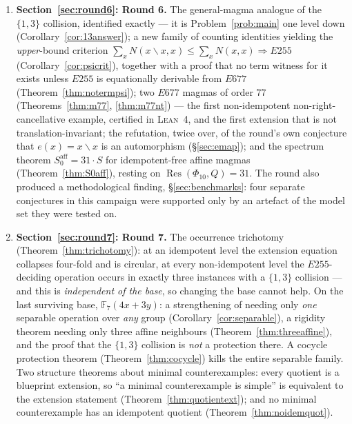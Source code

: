 \documentclass[11pt]{article}
\theoremstyle{plain}
\theoremstyle{definition}
\theoremstyle{remark}
\numberwithin{equation}{section}
\newcommand{\F}{\mathbb{F}}
\begin{document}
\begin{enumerate}
\item \textbf{Section~\ref{sec:round6}: Round 6.} The general-magma analogue of the
$\{1,3\}$ collision, identified exactly --- it is Problem~\ref{prob:main} one level down
(Corollary~\ref{cor:13answer}); a new family of counting identities yielding the
\emph{upper}-bound criterion $\sum_xN(x\backslash x,x)\le\sum_xN(x,x)\Rightarrow E255$
(Corollary~\ref{cor:psicrit}), together with a proof that no term witness for it exists
unless $E255$ is equationally derivable from $E677$ (Theorem~\ref{thm:notermpsi}); two $E677$ magmas of order $77$
(Theorems~\ref{thm:m77}, \ref{thm:m77nt}) --- the first non-idempotent
non-right-cancellative example, certified in \textsc{Lean}~4, and the first extension that
is not translation-invariant; the refutation, twice over, of the round's own conjecture that
$e(x) = x\backslash x$ is an automorphism (\S\ref{sec:emap}); and the spectrum theorem
$S_0^{\mathrm{aff}} = 31\cdot S$ for idempotent-free affine magmas
(Theorem~\ref{thm:S0aff}), resting on $\operatorname{Res}(\Phi_{10},Q) = 31$. The round
also produced a methodological finding, \S\ref{sec:benchmarks}: four separate conjectures
in this campaign were supported only by an artefact of the model set they were tested on.

\item \textbf{Section~\ref{sec:round7}: Round 7.} The occurrence trichotomy
(Theorem~\ref{thm:trichotomy}): at an idempotent level the extension equation collapses
four-fold and is circular, at every non-idempotent level the $E255$-deciding operation occurs
in exactly three instances with a $\{1,3\}$ collision --- and this is \emph{independent of the
base}, so changing the base cannot help. On the last surviving base, $\F_7(4x+3y)$: a
strengthening of \cite[Lemma~13.4]{blueprint} needing only \emph{one} separable operation over
\emph{any} group (Corollary~\ref{cor:separable}), a rigidity theorem needing only three affine
neighbours (Theorem~\ref{thm:threeaffine}), and the proof that the $\{1,3\}$ collision is
\emph{not} a protection there. A cocycle protection theorem
(Theorem~\ref{thm:cocycle}) kills the entire separable family. Two structure theorems about
minimal counterexamples: every quotient is a blueprint extension, so ``a minimal counterexample
is simple'' is equivalent to the extension statement (Theorem~\ref{thm:quotientext}); and no
minimal counterexample has an idempotent quotient (Theorem~\ref{thm:noidemquot}).


\end{enumerate}
\end{document}
